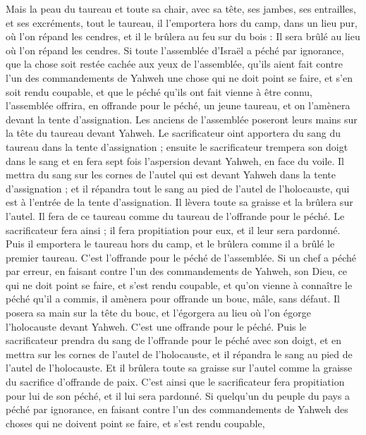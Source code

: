 \begin{multicols}{2}
Mais la peau du taureau et toute sa chair, avec sa tête, ses jambes, ses entrailles, et ses excréments,
tout le taureau, il l’emportera hors du camp, dans un lieu pur, où l'on répand les cendres, et il le brûlera au feu sur du bois : Il sera brûlé au lieu où l'on répand les cendres.
Si toute l'assemblée d'Israël a péché par ignorance, que la chose soit restée cachée aux yeux de l'assemblée, qu'ils aient fait contre l’un des commandements de Yahweh une chose qui ne doit point se faire, et s’en soit rendu coupable,
et que le péché qu'ils ont fait vienne à être connu, l'assemblée offrira, en offrande pour le péché, un jeune taureau, et on l'amènera devant la tente d'assignation.
Les anciens de l'assemblée poseront leurs mains sur la tête du taureau devant Yahweh.
Le sacrificateur oint apportera du sang du taureau dans la tente d'assignation ;
ensuite le sacrificateur trempera son doigt dans le sang et en fera sept fois l’aspersion devant Yahweh, en face du voile.
Il mettra du sang sur les cornes de l'autel qui est devant Yahweh dans la tente d'assignation ; et il répandra tout le sang au pied de l'autel de l'holocauste, qui est à l'entrée de la tente d'assignation.
Il lèvera toute sa graisse et la brûlera sur l'autel.
Il fera de ce taureau comme du taureau de l'offrande pour le péché. Le sacrificateur fera ainsi ; il fera propitiation pour eux, et il leur sera pardonné.
Puis il emportera le taureau hors du camp, et le brûlera comme il a brûlé le premier taureau. C'est l'offrande pour le péché de l'assemblée.
Si un chef a péché par erreur, en faisant contre l’un des commandements de Yahweh, son Dieu, ce qui ne doit point se faire, et s'est rendu coupable,
et qu'on vienne à connaître le péché qu'il a commis, il amènera pour offrande un bouc, mâle, sans défaut.
Il posera sa main sur la tête du bouc, et l'égorgera au lieu où l'on égorge l'holocauste devant Yahweh. C'est une offrande pour le péché.
Puis le sacrificateur prendra du sang de l'offrande pour le péché avec son doigt, et en mettra sur les cornes de l'autel de l'holocauste, et il répandra le sang au pied de l'autel de l'holocauste.
Et il brûlera toute sa graisse sur l'autel comme la graisse du sacrifice d’offrande de paix. C’est ainsi que le sacrificateur fera propitiation pour lui de son péché, et il lui sera pardonné.
Si quelqu’un du peuple du pays a péché par ignorance, en faisant contre l’un des commandements de Yahweh des choses qui ne doivent point se faire, et s'est rendu coupable,

\end{multicols}
